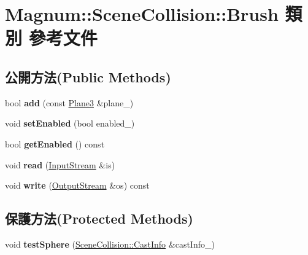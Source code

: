 \hypertarget{class_magnum_1_1_scene_collision_1_1_brush}{}\section{Magnum\+:\+:Scene\+Collision\+:\+:Brush 類別 參考文件}
\label{class_magnum_1_1_scene_collision_1_1_brush}
\subsection*{公開方法(Public Methods)}
\begin{DoxyCompactItemize}
\item 
bool {\bfseries add} (const \hyperlink{class_magnum_1_1_plane3}{Plane3} \&plane\+\_\+)\hypertarget{class_magnum_1_1_scene_collision_1_1_brush_ac5871b1a56686de2fd9dc1b57d360d36}{}\label{class_magnum_1_1_scene_collision_1_1_brush_ac5871b1a56686de2fd9dc1b57d360d36}

\item 
void {\bfseries set\+Enabled} (bool enabled\+\_\+)\hypertarget{class_magnum_1_1_scene_collision_1_1_brush_a7ac5bc94c0f8540cb107a824597c719b}{}\label{class_magnum_1_1_scene_collision_1_1_brush_a7ac5bc94c0f8540cb107a824597c719b}

\item 
bool {\bfseries get\+Enabled} () const \hypertarget{class_magnum_1_1_scene_collision_1_1_brush_aa704b7fb41ae8a626b4d4da4870dcc7a}{}\label{class_magnum_1_1_scene_collision_1_1_brush_aa704b7fb41ae8a626b4d4da4870dcc7a}

\item 
void {\bfseries read} (\hyperlink{class_magnum_1_1_input_stream}{Input\+Stream} \&is)\hypertarget{class_magnum_1_1_scene_collision_1_1_brush_a153f7b5ef193c37343fe714f8ce5c322}{}\label{class_magnum_1_1_scene_collision_1_1_brush_a153f7b5ef193c37343fe714f8ce5c322}

\item 
void {\bfseries write} (\hyperlink{class_magnum_1_1_output_stream}{Output\+Stream} \&os) const \hypertarget{class_magnum_1_1_scene_collision_1_1_brush_abad711d32d17f27f2a4ca526c6e33805}{}\label{class_magnum_1_1_scene_collision_1_1_brush_abad711d32d17f27f2a4ca526c6e33805}

\end{DoxyCompactItemize}
\subsection*{保護方法(Protected Methods)}
\begin{DoxyCompactItemize}
\item 
void {\bfseries test\+Sphere} (\hyperlink{class_magnum_1_1_scene_collision_1_1_cast_info}{Scene\+Collision\+::\+Cast\+Info} \&cast\+Info\+\_\+)\hypertarget{class_magnum_1_1_scene_collision_1_1_brush_a7ff4c1a6f50347ed44f28b4444e26450}{}\label{class_magnum_1_1_scene_collision_1_1_brush_a7ff4c1a6f50347ed44f28b4444e26450}

\end{DoxyCompactItemize}
